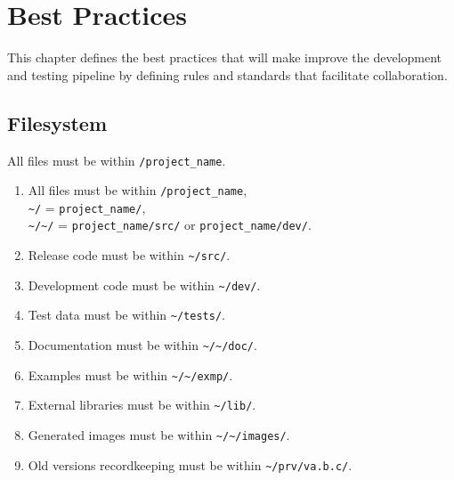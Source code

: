 \chapter{Best Practices}\label{c:best_practices}
This chapter defines the best practices that will make improve the development and testing pipeline by defining rules and standards that facilitate collaboration.
\section{Filesystem}\label{c:best_practices:s:filesystem}
All files must be within \texttt{/project\_name}.
\begin{enumerate}
	\item All files must be within \texttt{/project\_name},\\
	      \texttt{\textasciitilde/} = \texttt{project\_name/}, \\
	      \texttt{\textasciitilde/\textasciitilde/} = \texttt{project\_name/src/} or \texttt{project\_name/dev/}.
	\item Release code must be within \texttt{\textasciitilde/src/}.
	\item Development code must be within \texttt{\textasciitilde/dev/}.
	\item Test data must be within \texttt{\textasciitilde/tests/}.
	\item Documentation must be within \texttt{\textasciitilde/\textasciitilde/doc/}.
	\item Examples must be within \texttt{\textasciitilde/\textasciitilde/exmp/}.
	\item External libraries must be within \texttt{\textasciitilde/lib/}.
	\item Generated images must be within \texttt{\textasciitilde/\textasciitilde/images/}.
	\item Old versions recordkeeping must be within \texttt{\textasciitilde/prv/va.b.c/}.
\end{enumerate}
%
